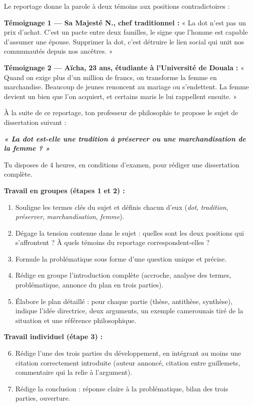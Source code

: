 \documentclass[11pt]{article}
\newcounter{popsec}
\newcounter{popsub}
\newcommand{\courssub}[1]{%
  \stepcounter{popsub}%
  \par\vspace{9pt}\noindent{\popxbold\fontsize{11.5}{13}\selectfont\color{popink}{\color{poporange}\thepopsec.\thepopsub}\hspace{6pt}#1}\par\nopagebreak\vspace{4pt}
}
\begin{document}
Le reportage donne la parole à deux témoins aux positions contradictoires :

\textbf{Témoignage 1 — Sa Majesté N., chef traditionnel :} « La dot n'est pas un prix d'achat. C'est un pacte entre deux familles, le signe que l'homme est capable d'assumer une épouse. Supprimer la dot, c'est détruire le lien social qui unit nos communautés depuis nos ancêtres. »

\textbf{Témoignage 2 — Aïcha, 23 ans, étudiante à l'Université de Douala :} « Quand on exige plus d'un million de francs, on transforme la femme en marchandise. Beaucoup de jeunes renoncent au mariage ou s'endettent. La femme devient un bien que l'on acquiert, et certains maris le lui rappellent ensuite. »

À la suite de ce reportage, ton professeur de philosophie te propose le sujet de dissertation suivant :

\begin{center}
\textbf{\emph{« La dot est-elle une tradition à préserver ou une marchandisation de la femme ? »}}
\end{center}

Tu disposes de 4 heures, en conditions d'examen, pour rédiger une dissertation complète.

\courssub{Consignes}

\textbf{Travail en groupes (étapes 1 et 2) :}
\begin{enumerate}
\item Souligne les termes clés du sujet et définis chacun d'eux (\emph{dot}, \emph{tradition}, \emph{préserver}, \emph{marchandisation}, \emph{femme}).
\item Dégage la tension contenue dans le sujet : quelles sont les deux positions qui s'affrontent ? À quels témoins du reportage correspondent-elles ?
\item Formule la problématique sous forme d'une question unique et précise.
\item Rédige en groupe l'introduction complète (accroche, analyse des termes, problématique, annonce du plan en trois parties).
\item Élabore le plan détaillé : pour chaque partie (thèse, antithèse, synthèse), indique l'idée directrice, deux arguments, un exemple camerounais tiré de la situation et une référence philosophique.
\end{enumerate}

\textbf{Travail individuel (étape 3) :}
\begin{enumerate}
\setcounter{enumi}{5}
\item Rédige l'une des trois parties du développement, en intégrant au moins une citation correctement introduite (auteur annoncé, citation entre guillemets, commentaire qui la relie à l'argument).
\item Rédige la conclusion : réponse claire à la problématique, bilan des trois parties, ouverture.
\end{enumerate}
\end{document}
